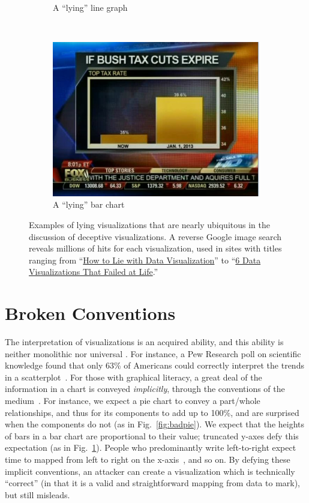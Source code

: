 \documentclass{vgtc}                          %
\begin{document}
\begin{figure}
\begin{subfigure}{0.45\columnwidth}
		\caption{A ``lying'' line graph}
	\end{subfigure}
    ~
	\begin{subfigure}{0.45\columnwidth}
		\includegraphics[width=\textwidth]{pictures/foxbar.jpg}
		\caption{A ``lying'' bar chart}
		\label{fig:badbar}
	\end{subfigure}
	\caption{Examples of lying visualizations that are nearly ubiquitous in the discussion of deceptive visualizations. A reverse Google image search reveals millions of hits for each visualization, used in sites with titles ranging from ``\href{https://blog.heapanalytics.com/how-to-lie-with-data-visualization/}{How to Lie with Data Visualization}'' to ``\href{http://www.visualnews.com/2015/11/06/6-data-visualizations-that-failed-at-life/}{6 Data Visualizations That Failed at Life}.'' }
	\label{fig:examples}
\end{figure}

\section{Broken Conventions}

The interpretation of visualizations is an acquired ability, and this ability is neither monolithic nor universal \cite{boy2014principled}. For instance, a Pew Research poll on scientific knowledge found that only 63\% of Americans could correctly interpret the trends in a scatterplot~\cite{pew2015}. For those with graphical literacy, a great deal of the information in a chart is conveyed \emph{implicitly}, through the conventions of the medium~\cite{kennedy2016work}. For instance, we expect a pie chart to convey a part/whole relationships, and thus for its components to add up to 100\%, and are surprised when the components do not (as in Fig.~\ref{fig:badpie}). We expect that the heights of bars in a bar chart are proportional to their value; truncated y-axes defy this expectation (as in Fig.~\ref{fig:badbar}). People who predominantly write left-to-right expect time to mapped from left to right on the x-axis~\cite{bergen2012writing,tversky1991cross}, and so on. By defying these implicit conventions, an attacker can create a visualization which is technically ``correct'' (in that it is a valid and straightforward mapping from data to mark), but still misleads.
\end{document}
